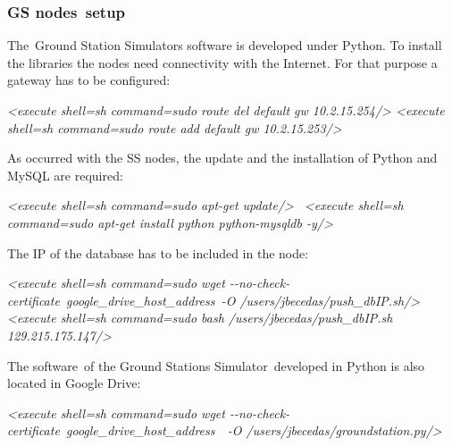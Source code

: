 \documentclass[a4paper]{article}
\begin{document}
\bigskip

\subsubsection[GS nodes\ setup]{GS nodes\ setup}
\hypertarget{Toc390097014}{}
\bigskip

The\ Ground Station Simulators software is developed under Python. To
install the libraries the nodes need connectivity with the Internet.
For that purpose a gateway has to be configured:


\bigskip

{\itshape
{\textless}execute shell={\textquotedbl}sh{\textquotedbl}
command={\textquotedbl}sudo route del default gw
10.2.15.254{\textquotedbl}/{\textgreater}\newline
{\textless}execute shell={\textquotedbl}sh{\textquotedbl}
command={\textquotedbl}sudo route add default gw
10.2.15.253{\textquotedbl}/{\textgreater}}

As occurred with the SS nodes, the update and the installation of Python
and MySQL are required:


\bigskip

\textit{{\textless}execute shell={\textquotedbl}sh{\textquotedbl}
command={\textquotedbl}sudo apt-get
update{\textquotedbl}/{\textgreater}}\textit{\newline
\ {\textless}execute shell={\textquotedbl}sh{\textquotedbl}
command={\textquotedbl}sudo apt-get install python python-mysqldb
-y{\textquotedbl}/{\textgreater}}


\bigskip

The IP of the database has to be included in the node:


\bigskip

\textit{{\textless}execute shell={\textquotedbl}sh{\textquotedbl}
command={\textquotedbl}sudo wget
-{}-no-check-certificate\ }\textit{\textcolor[rgb]{0.7529412,0.0,0.0}{google\_drive\_host\_address}}\textit{\ }\textit{{}-O
/users/jbecedas/push\_dbIP.sh{\textquotedbl}/{\textgreater}}\textit{\newline
{\textless}execute shell={\textquotedbl}sh{\textquotedbl}
command={\textquotedbl}sudo bash /users/jbecedas/push\_dbIP.sh
129.215.175.147{\textquotedbl}/{\textgreater}}


\bigskip

The software\ of the Ground Stations Simulator\ developed in Python is
also located in Google Drive:


\bigskip

\textit{{\textless}execute shell={\textquotedbl}sh{\textquotedbl}
command={\textquotedbl}sudo wget
-{}-no-check-certificate\ }\textit{\textcolor[rgb]{0.7529412,0.0,0.0}{google\_drive\_host\_address}}\textit{\ }\textit{\ }\textit{{}-O
/users/jbecedas/groundstation.py{\textquotedbl}/{\textgreater}}
\end{document}
